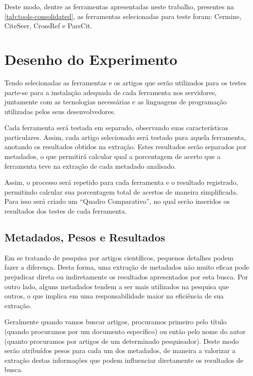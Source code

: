Deste modo, dentre as ferramentas apresentadas neste trabalho, presentes na \autoref{tab:tools-consolidated}, as ferramentas selecionadas para teste foram: Cermine, CiteSeer, CrossRef e ParsCit.
    

\section{Desenho do Experimento}
\label{sec:experiment-design}

Tendo selecionadas as ferramentas e os artigos que serão utilizados para os testes parte-se para a instalação adequada de cada ferramenta nos servidores, juntamente com as tecnologias necessárias e as linguagens de programação utilizadas pelos seus desenvolvedores. 

Cada ferramenta será testada em separado, observando suas características particulares. Assim, cada artigo selecionado será testado para aquela ferramenta, anotando os resultados obtidos na extração. Estes resultados serão separados por metadados, o que permitirá calcular qual a porcentagem de acerto que a ferramenta teve na extração de cada metadado analisado.

Assim, o processo será repetido para cada ferramenta e o resultado registrado, permitindo calcular sua porcentagem total de acertos de maneira simplificada. Para isso será criado um ``Quadro Comparativo'', no qual serão inseridos os resultados dos testes de cada ferramenta. 

\subsection{Metadados, Pesos e Resultados}
\label{ssec:metadata-results}


Em se tratando de pesquisa por artigos científicos, pequenos detalhes podem fazer a diferença. Desta forma, uma extração de metadados não muito eficaz pode prejudicar direta ou indiretamente os resultados apresentados por esta busca. Por outro lado, alguns metadados tendem a ser mais utilizados na pesquisa que outros, o que implica em uma responsabilidade maior na eficiência de sua extração. 


Geralmente quando vamos buscar artigos, procuramos primeiro pelo título (quando procuramos por um documento específico) ou então pelo nome do autor (quanto procuramos por artigos de um determinado pesquisador). Deste modo serão atribuídos pesos para cada um dos metadados, de maneira a valorizar a extração destas informações que podem influenciar diretamente os resultados de busca.

